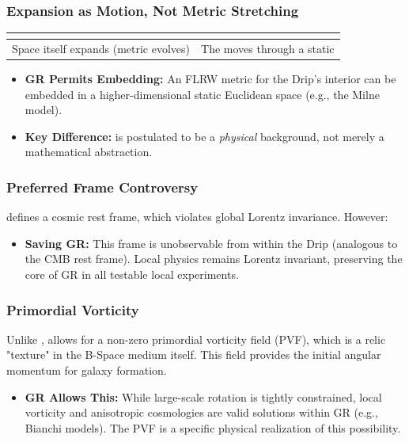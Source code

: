 \documentclass{BSpacePaper} %
\begin{document}
\begin{appendices}
\subsubsection{Expansion as Motion, Not Metric Stretching}
\begin{center}
\begin{tabular}{ll}
\toprule
\textbf{\lcdm{}} & \textbf{\bspace{}} \\
\midrule
Space itself expands (metric evolves) & The \drip{} moves through a static \bspace{} \\
\bottomrule
\end{tabular}
\end{center}
\begin{itemize}
    \item \textbf{GR Permits Embedding:} An FLRW metric for the Drip's interior can be embedded in a higher-dimensional static Euclidean space (e.g., the Milne model).
    \item \textbf{Key Difference:} \bspace{} is postulated to be a \textit{physical} background, not merely a mathematical abstraction.
\end{itemize}

\subsubsection{Preferred Frame Controversy}
\bspace{} defines a cosmic rest frame, which violates global Lorentz invariance. However:
\begin{itemize}
    \item \textbf{Saving GR:} This frame is unobservable from within the Drip (analogous to the CMB rest frame). Local physics remains Lorentz invariant, preserving the core of GR in all testable local experiments.
\end{itemize}

\subsubsection{Primordial Vorticity}
Unlike \lcdm{}, \bspace{} allows for a non-zero primordial vorticity field (PVF), which is a relic "texture" in the B-Space medium itself. This field provides the initial angular momentum for galaxy formation.
\begin{itemize}
    \item \textbf{GR Allows This:} While large-scale rotation is tightly constrained, local vorticity and anisotropic cosmologies are valid solutions within GR (e.g., Bianchi models). The PVF is a specific physical realization of this possibility.
\end{itemize}


\end{appendices}
\end{document}
